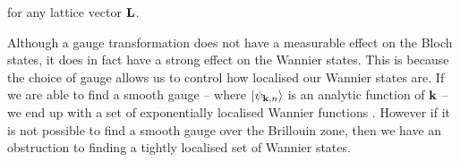 for any lattice vector $\bf L$.\par
Although a gauge transformation does not have a measurable effect on the Bloch states, it does in fact have a strong effect on the Wannier states. This is because the choice of gauge allows us to control how localised our Wannier states are. If we are able to find a smooth gauge -- where $\ket{\psi_{\bf k, n}}$ is an analytic function of $\bf k$ -- we end up with a set of exponentially localised Wannier functions \cite{cloizeaux_energy_1964}. However if it is not possible to find a smooth gauge over the Brillouin zone, then we have an obstruction to finding a tightly localised set of Wannier states.\par

